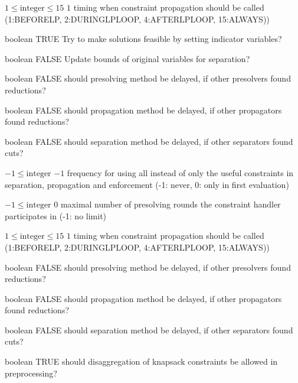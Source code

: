 %
{$1\leq\textrm{integer}\leq15$}%
{$1$}%
{timing when constraint propagation should be called (1:BEFORELP, 2:DURINGLPLOOP, 4:AFTERLPLOOP, 15:ALWAYS))}%
{}

%
{boolean}%
{TRUE}%
{Try to make solutions feasible by setting indicator variables?}%
{}

%
{boolean}%
{FALSE}%
{Update bounds of original variables for separation?}%
{}

%
{boolean}%
{FALSE}%
{should presolving method be delayed, if other presolvers found reductions?}%
{}

%
{boolean}%
{FALSE}%
{should propagation method be delayed, if other propagators found reductions?}%
{}

%
{boolean}%
{FALSE}%
{should separation method be delayed, if other separators found cuts?}%
{}

%
{$-1\leq\textrm{integer}$}%
{$-1$}%
{frequency for using all instead of only the useful constraints in separation, propagation and enforcement (-1: never, 0: only in first evaluation)}%
{}

%
{$-1\leq\textrm{integer}$}%
{$0$}%
{maximal number of presolving rounds the constraint handler participates in (-1: no limit)}%
{}

%
{$1\leq\textrm{integer}\leq15$}%
{$1$}%
{timing when constraint propagation should be called (1:BEFORELP, 2:DURINGLPLOOP, 4:AFTERLPLOOP, 15:ALWAYS))}%
{}

%
{boolean}%
{FALSE}%
{should presolving method be delayed, if other presolvers found reductions?}%
{}

%
{boolean}%
{FALSE}%
{should propagation method be delayed, if other propagators found reductions?}%
{}

%
{boolean}%
{FALSE}%
{should separation method be delayed, if other separators found cuts?}%
{}

%
{boolean}%
{TRUE}%
{should disaggregation of knapsack constraints be allowed in preprocessing?}%
{}


